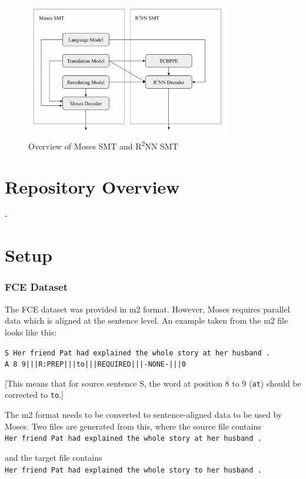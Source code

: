 \documentclass[12pt,a4paper,twoside,openright]{report}
\begin{document}
\begin{figure}[ht]
\centering
\includegraphics[width=0.8\textwidth]{images/overview_moses_r2nn.png}
\caption{Overview of Moses SMT and R\textsuperscript{2}NN SMT}
\label{fig:moses_r2nn}
\end{figure}

\section{Repository Overview}
-

\section{Setup}

\subsubsection{FCE Dataset}

The FCE dataset was provided in m2 format. However, Moses requires parallel data which is aligned at the sentence level. An example taken from the m2 file looks like this:

\texttt{S Her friend Pat had explained the whole story at her husband .\\
A 8 9|||R:PREP|||to|||REQUIRED|||-NONE-|||0}

[This means that for source sentence S, the word at position 8 to 9 (\texttt{at}) should be corrected to \texttt{to}.]

The m2 format needs to be converted to sentence-aligned data to be used by Moses. Two files are generated from this, where the source file contains\\
\texttt{Her friend Pat had explained the whole story at her husband .}

and the target file contains\\
\texttt{Her friend Pat had explained the whole story to her husband .}
\end{document}
